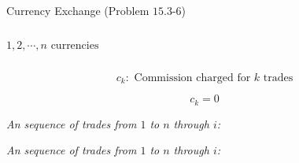 
\begin{frame}{}
  \begin{exampleblock}{Currency Exchange (Problem $15.3$-$6$)}
    \begin{columns}
	\[
	  1, 2, \cdots, n \text{ currencies}
	\]
	\pause

    \end{columns}

    \pause
    \vspace{0.50cm}
    \[
      c_k: \text{ Commission charged for $k$ trades}
    \]
  \end{exampleblock}

  \pause
  \[
    c_{k} = 0
  \]
\end{frame}

\begin{frame}{}

  \pause
  \vspace{0.30cm}
  \begin{center}
    {\large \it An  sequence of trades from $1$ to $n$ through $i$:}
  \end{center}

\end{frame}

\begin{frame}{}

  \pause
  \vspace{0.20cm}
  \begin{center}
    {\large \it An  sequence of trades from $1$ to $n$ through $i$:}
  \end{center}


  \pause
  \begin{center}
    {\large \it {}}
  \end{center}
\end{frame}

